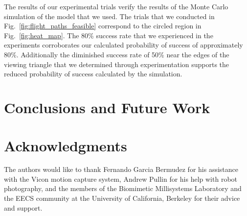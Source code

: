 \documentclass{aamas2013}
\begin{document}
The results of our experimental trials verify the results of the Monte Carlo
simulation of the model that we used. The trials that we conducted in
Fig.~\ref{fig:flight_paths_feasible} correspond to the circled region in
Fig.~\ref{fig:heat_map}. The 80\% success rate that we experienced in the
experiments corroborates our calculated probability of success of
approximately 80\%. Additionally the diminished success rate of 50\% near the edges of the viewing triangle that we determined through experimentation supports the reduced probability of success calculated by the simulation.



\section{Conclusions and Future Work}
\section{Acknowledgments}
The authors would like to thank Fernando Garcia Bermudez for his 
assistance with the Vicon motion capture system, Andrew Pullin for his 
help with robot photography, and the members of the Biomimetic 
Millisystems Laboratory and the EECS community at the University of 
California, Berkeley for their advice and support.






\end{document}
